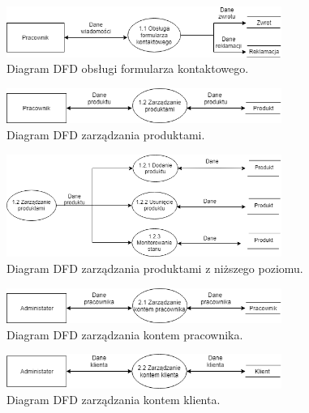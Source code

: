 \documentclass[a4paper,11pt]{article}
\begin{document}
\begin{figure}[H]
	\centering
		\includegraphics[width=0.8\textwidth]{Diagramy/DFD0-DFD11.png}
	\caption{Diagram DFD obsługi formularza kontaktowego.}
\end{figure}


\begin{figure}[H]
	\centering
		\includegraphics[width=0.8\textwidth]{Diagramy/DFD0-DFD12.png}
	\caption{Diagram DFD zarządzania produktami.}
\end{figure}

\begin{figure}[H]
	\centering
		\includegraphics[width=0.8\textwidth]{Diagramy/DFD0-pracownik-produkt.png}
	\caption{Diagram DFD zarządzania produktami z niższego poziomu.}
\end{figure}

\begin{figure}[H]
	\centering
		\includegraphics[width=0.8\textwidth]{Diagramy/DFD0-DFD22.png}
	\caption{Diagram DFD zarządzania kontem pracownika.}
\end{figure}

\begin{figure}[H]
	\centering
		\includegraphics[width=0.8\textwidth]{Diagramy/DFD0-DFD21.png}
	\caption{Diagram DFD zarządzania kontem klienta.}
\end{figure}
\end{document}
